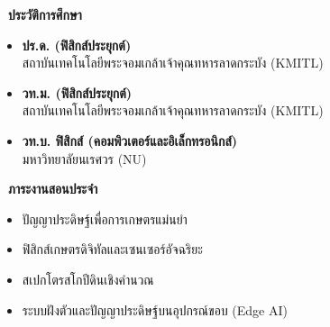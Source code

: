 \noindent
\begin{minipage}[t]{0.48\textwidth}
    {\fontsize{11}{14}\selectfont\bfseries\color{teal!80!black}\textbullet\ ประวัติการศึกษา}\\[6pt]
    {\fontsize{9.5}{13.5}\selectfont
    \begin{itemize}[leftmargin=1.4em, itemsep=3pt]
        \item \textbf{ปร.ด. (ฟิสิกส์ประยุกต์)}\\
        สถาบันเทคโนโลยีพระจอมเกล้าเจ้าคุณทหารลาดกระบัง (KMITL)
        \item \textbf{วท.ม. (ฟิสิกส์ประยุกต์)}\\
        สถาบันเทคโนโลยีพระจอมเกล้าเจ้าคุณทหารลาดกระบัง (KMITL)
        \item \textbf{วท.บ. ฟิสิกส์ (คอมพิวเตอร์และอิเล็กทรอนิกส์)}\\
        มหาวิทยาลัยนเรศวร (NU)
    \end{itemize}
    }

    \vspace{12pt}
    {\fontsize{11}{14}\selectfont\bfseries\color{teal!80!black}\textbullet\ ภาระงานสอนประจำ}\\[6pt]
    {\fontsize{9}{12.5}\selectfont
    \begin{itemize}[leftmargin=1.4em, itemsep=2pt]
        \item ปัญญาประดิษฐ์เพื่อการเกษตรแม่นยำ
        \item ฟิสิกส์เกษตรดิจิทัลและเซนเซอร์อัจฉริยะ
        \item สเปกโตรสโกปีดินเชิงคำนวณ
        \item ระบบฝังตัวและปัญญาประดิษฐ์บนอุปกรณ์ขอบ (Edge AI)
    \end{itemize}
    }
\end{minipage}%
\hfill
